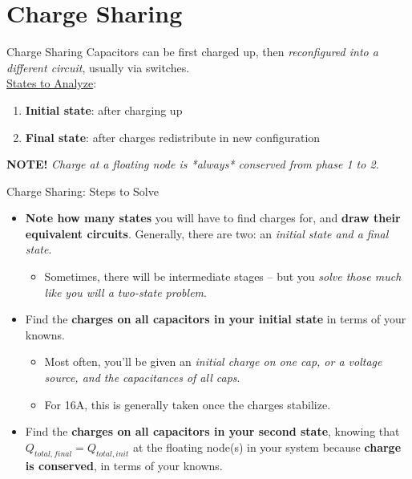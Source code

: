 \section{Charge Sharing}

\begin{frame}{Charge Sharing}
    Capacitors can be first charged up, then \textit{reconfigured into a different circuit}, usually via switches. \\[5pt]
    \underline{States to Analyze}:
    \begin{enumerate}
        \item \textbf{Initial state}: after charging up
        \item \textbf{Final state}: after charges redistribute in new configuration
    \end{enumerate}

    \textbf{NOTE!} \textit{Charge at a floating node is *always* conserved from phase 1 to 2.}
\end{frame}

\begin{frame}{Charge Sharing: Steps to Solve}
    \begin{itemize}
        \item\textbf{Note how many states} you will have to find charges for, and \textbf{draw their equivalent circuits}. Generally, there are two: an \textit{initial state and a final state}. 
        \begin{itemize}
            \item Sometimes, there will be intermediate stages -- but you \textit{solve those much like you will a two-state problem}.
        \end{itemize}
        \item Find the \textbf{charges on all capacitors in your initial state} in terms of your knowns.
        \begin{itemize}
            \item Most often, you’ll be given an \textit{initial charge on one cap, or a voltage source, and the capacitances of all caps}. 
            \item For 16A, this is generally taken once the charges stabilize.
        \end{itemize}
        \item Find the \textbf{charges on all capacitors in your second state}, knowing that $Q_{total, final} = Q_{total, init}$ at the floating node(s) in your system because \textbf{charge is conserved}, in terms of your knowns.
    \end{itemize}
\end{frame}

